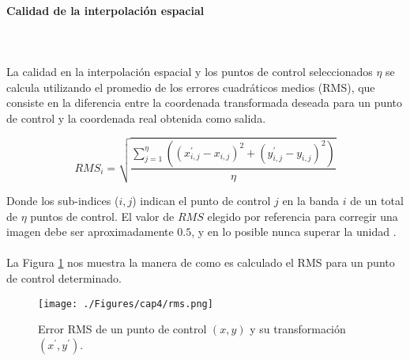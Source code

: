   \paragraph{Calidad de la interpolaci\'on espacial }\mbox{}\\\mbox{}\\
 La calidad en la interpolaci\'on espacial y los puntos de control seleccionados $ \eta $ se calcula utilizando el promedio de los errores cuadr\'aticos medios (RMS), que consiste en la diferencia entre la coordenada transformada deseada para un punto de control y la coordenada real obtenida como salida.

 \begin{equation}
 RMS_{i} = \sqrt{\dfrac{\sum_{j=1}^{\eta} ((x_{i,j}^{'}-x_{i,j})^{2}+(y_{i,j}^{'}-y_{i,j})^{2})}{\eta}}
 \end{equation} 

 	Donde los sub-indices ($i,j$) indican el punto de control $ j $ en la banda $ i $ de un total de $ \eta $ puntos de control. El valor de $ RMS $ elegido por referencia para corregir una imagen debe ser aproximadamente $ 0.5 $, y en lo posible nunca superar la unidad \cite{guide1999erdas}. \\~\\
 	La Figura \ref{fig:rms} nos muestra la manera de como es calculado el RMS para un punto de control determinado.
 
 
     \begin{figure}[H]
     	\centering
     	\texttt{[image: ./Figures/cap4/rms.png]}
     	\caption{Error RMS de un punto de control $ (x,y) $ y su transformaci\'on $ (x^{'},y^{'}) $.}
     	\label{fig:rms}
     \end{figure}



